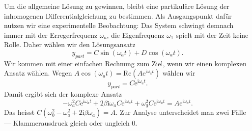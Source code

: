\documentclass[%
11pt,%
twoside,%
titlepage,%
swissgerman,%
headsepline%
]{scrartcl}
\theoremstyle{definition}
\theoremstyle{plain}
\begin{document}
Um die allgemeine Lösung zu gewinnen, bleibt eine partikuläre Lösung der inhomogenen Differentialgleichung zu bestimmen. Als Ausgangspunkt dafür nutzen wir eine experimentelle Beobachtung: Das System schwingt demnach immer mit der Erregerfrequenz $\omega_a$, die Eigenfrequenz $\omega_1$ spielt mit der Zeit keine Rolle. Daher wählen wir den Lösungsansatz
$$y_{part}=C\sin(\omega_a t)+D\cos(\omega_a t).$$
Wir kommen mit einer einfachen Rechnung zum Ziel, wenn wir einen komplexen Ansatz wählen. Wegen $A\cos(\omega_a t)=\mathrm{Re}(A\mathrm{e}^{\mathrm{i}\omega_a t})$ wählen wir
$$y_{part}=C\mathrm{e}^{\mathrm{i}\omega_a t}.$$
Damit ergibt sich der komplexe Ansatz
$$-\omega_a^2C\mathrm{e}^{\mathrm{i}\omega_a t}+2\beta\mathrm{i}\omega_a C\mathrm{e}^{\mathrm{i}\omega_a t}+\omega_0^2C\mathrm{e}^{\mathrm{i}\omega_a t}=A\mathrm{e}^{\mathrm{i}\omega_a t}.$$
Das heisst $C(\omega_0^2-\omega_a^2+2\mathrm{i}\beta\omega_a)=A$. Zur Analyse unterscheidet man zwei Fälle --- Klammerausdruck gleich oder ungleich $0$.
\end{document}
